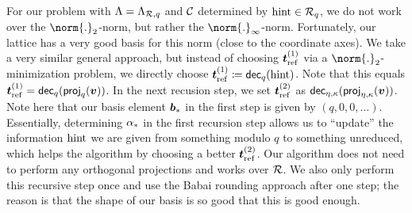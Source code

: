 \begin{remark}
For our problem with $\Lambda = \Lambda_{\mathcal{R},q}$ and $\mathcal{C}$ determined by $\mathrm{hint}\in\mathcal{R}_q$, we do not work over the $\norm{.}_2$-norm, but rather the $\norm{.}_\infty$-norm. Fortunately, our lattice has a very good basis for this norm (close to the coordinate axes). We take a very similar general approach, but instead of choosing $\boldsymbol{t}_{\mathrm{ref}}^{(1)}$ via a $\norm{.}_2$-minimization problem, we directly choose $\boldsymbol{t}_{\mathrm{ref}}^{(1)} \coloneqq \mathsf{dec}_{q}(\mathrm{hint})$. Note that this equals $\boldsymbol{t}_{\mathrm{ref}}^{(1)}=\mathsf{dec}_{q}(\mathsf{proj}_{q}(\boldsymbol{v}))$. In the next recusion step, we set $\boldsymbol{t}_{\mathrm{ref}}^{(2)}$ as $\mathsf{dec}_{\eta,\kappa}(\mathsf{proj}_{\eta,\kappa}(\boldsymbol{v}))$. Note here that our basis element $\boldsymbol{b}_{\ast}$ in the first step is given by $(q,0,0,\ldots)$. Essentially, determining $\alpha_{\ast}$ in the first recursion step allows us to ``update'' the information $\mathrm{hint}$ we are given from something modulo $q$ to something unreduced, which helps the algorithm by choosing a better $\boldsymbol{t}_{\mathrm{ref}}^{(2)}$.
Our algorithm does not need to perform any orthogonal projections and works over $\mathcal{R}$. We also only perform this recursive step once and use the Babai rounding approach after one step; the reason is that the shape of our basis is so good that this is good enough.






\end{remark}
